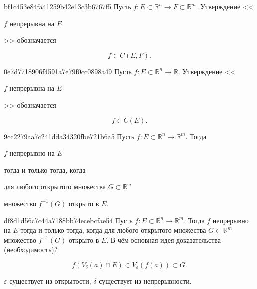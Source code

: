 \begin{note}{bf1c453e84fa41259b42e13c3b6767f5}
    Пусть \({ f : E \subset \mathbb R^{n} \to F \subset \mathbb R^{m} }\). Утверждение <<\begin{icloze}{2}\({ f }\) непрерывна на \({ E }\)\end{icloze}>> обозначается
    \begin{icloze}{1}
        \[
            f \in C(E, F).
        \]
    \end{icloze}
\end{note}

\begin{note}{0e7d7718906f4591a7e79f0cc0898a49}
    Пусть \({ f : E \subset \mathbb R^{n} \to \mathbb R }\). Утверждение <<\begin{icloze}{2}\({ f }\) непрерывна на \({ E }\)\end{icloze}>> обозначается
    \begin{icloze}{1}
        \[
            f \in C(E).
        \]
    \end{icloze}
\end{note}

\begin{note}{9cc2279aa7c241dda34320fbe721b6a5}
    Пусть \({ f : E \subset \mathbb R^{n} \to \mathbb R^{m} }\). Тогда  \begin{icloze}{3}\({ f }\) непрерывно на \({ E }\)\end{icloze}
    \begin{icloze}{4}тогда и только тогда, когда\end{icloze}
    \begin{icloze}{2}для любого открытого множества \({ G \subset \mathbb R^{m} }\)\end{icloze} \begin{icloze}{1}множество \({ f^{-1}(G) }\) открыто в \({ E }\).\end{icloze}
\end{note}

\begin{note}{df8d1d56c7c44a7188bb74ecebcfae54}
    Пусть \({ f : E \subset \mathbb R^{n} \to \mathbb R^{m} }\). Тогда  \({ f }\) непрерывно на \({ E }\)
    тогда и только тогда, когда
    для любого открытого множества \({ G \subset \mathbb R^{m} }\) множество \({ f^{-1}(G) }\) открыто в \({ E }\).
    В чём основная идея доказательства (необходимость)?

    \begin{cloze}{1}


        \[
            f(V_\delta(a) \cap E) \subset V_\varepsilon(f(a)) \subset G.
        \]
        \begin{center}
            \tiny
            \({ \varepsilon }\) существует из открытости,
            \({ \delta }\) существует из непрерывности.
        \end{center}
    \end{cloze}
\end{note}


